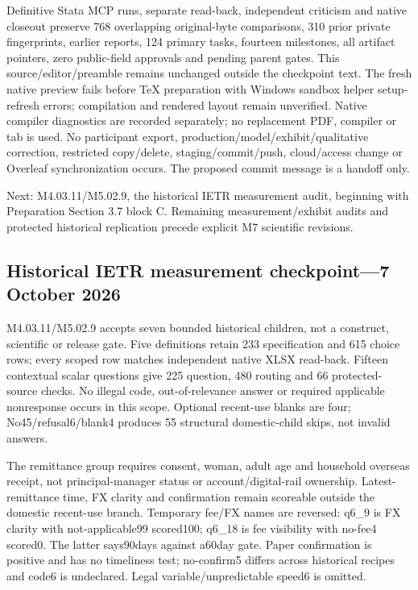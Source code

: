 \documentclass[11pt,a4paper]{article}
\begin{document}
Definitive Stata MCP runs, separate read-back, independent criticism and
native closeout preserve 768 overlapping original-byte comparisons,
310 prior private fingerprints, earlier reports, 124 primary tasks,
fourteen milestones, all artifact pointers, zero public-field approvals and
pending parent gates. This source/editor/preamble remains unchanged outside
the checkpoint text. The fresh native preview fails before TeX preparation
with Windows sandbox helper setup-refresh errors; compilation and rendered
layout remain unverified. Native compiler diagnostics are recorded separately;
no replacement PDF, compiler or tab is used. No participant export,
production/model/exhibit/qualitative correction, restricted copy/delete,
staging/commit/push, cloud/access change or Overleaf synchronization occurs.
The proposed commit message is a handoff only.

Next: M4.03.11/M5.02.9, the historical IETR measurement audit, beginning
with Preparation Section 3.7 block C. Remaining measurement/exhibit audits
and protected historical replication precede explicit M7 scientific revisions.

\subsection{Historical IETR measurement checkpoint---7 October 2026}
M4.03.11/M5.02.9 accepts seven bounded historical children, not a construct,
scientific or release gate. Five definitions retain 233 specification and
615 choice rows; every scoped row matches independent native XLSX read-back.
Fifteen contextual scalar questions give 225 question, 480 routing and
66 protected-source checks. No illegal code, out-of-relevance answer or
required applicable nonresponse occurs in this scope. Optional recent-use
blanks are four; No45/refusal6/blank4 produces 55 structural domestic-child
skips, not invalid answers.

The remittance group requires consent, woman, adult age and household
overseas receipt, not principal-manager status or account/digital-rail
ownership. Latest-remittance time, FX clarity and confirmation remain
scoreable outside the domestic recent-use branch. Temporary fee/FX names
are reversed: q6\_9 is FX clarity with not-applicable99 scored100; q6\_18 is
fee visibility with no-fee4 scored0. The latter says90days against a60day
gate. Paper confirmation is positive and has no timeliness test; no-confirm5
differs across historical recipes and code6 is undeclared. Legal
variable/unpredictable speed6 is omitted.
\end{document}
